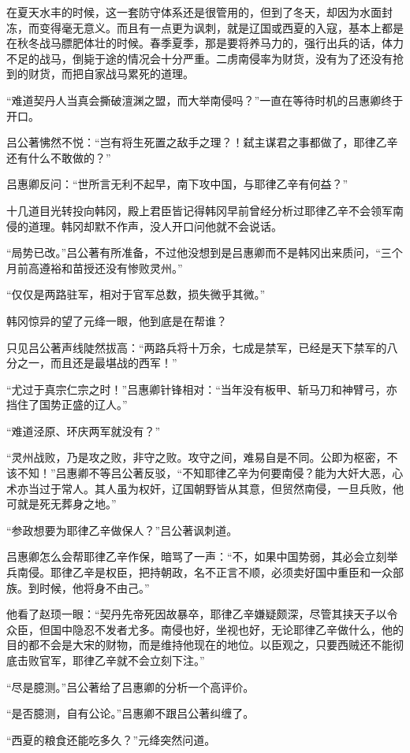 在夏天水丰的时候，这一套防守体系还是很管用的，但到了冬天，却因为水面封冻，而变得毫无意义。而且有一点更为讽刺，就是辽国或西夏的入寇，基本上都是在秋冬战马膘肥体壮的时候。春季夏季，那是要将养马力的，强行出兵的话，体力不足的战马，倒毙于途的情况会十分严重。二虏南侵率为财货，没有为了还没有抢到的财货，而把自家战马累死的道理。

“难道契丹人当真会撕破澶渊之盟，而大举南侵吗？”一直在等待时机的吕惠卿终于开口。

吕公著怫然不悦：“岂有将生死置之敌手之理？！弑主谋君之事都做了，耶律乙辛还有什么不敢做的？”

吕惠卿反问：“世所言无利不起早，南下攻中国，与耶律乙辛有何益？”

十几道目光转投向韩冈，殿上君臣皆记得韩冈早前曾经分析过耶律乙辛不会领军南侵的道理。韩冈却默不作声，没人开口问他就不会说话。

“局势已改。”吕公著有所准备，不过他没想到是吕惠卿而不是韩冈出来质问，“三个月前高遵裕和苗授还没有惨败灵州。”

“仅仅是两路驻军，相对于官军总数，损失微乎其微。”

韩冈惊异的望了元绛一眼，他到底是在帮谁？

只见吕公著声线陡然拔高：“两路兵将十万余，七成是禁军，已经是天下禁军的八分之一，而且还是最堪战的西军！”

“尤过于真宗仁宗之时！”吕惠卿针锋相对：“当年没有板甲、斩马刀和神臂弓，亦挡住了国势正盛的辽人。”

“难道泾原、环庆两军就没有？”

“灵州战败，乃是攻之败，非守之败。攻守之间，难易自是不同。公即为枢密，不该不知！”吕惠卿不等吕公著反驳，“不知耶律乙辛为何要南侵？能为大奸大恶，心术亦当过于常人。其人虽为权奸，辽国朝野皆从其意，但贸然南侵，一旦兵败，他可就是死无葬身之地。”

“参政想要为耶律乙辛做保人？”吕公著讽刺道。

吕惠卿怎么会帮耶律乙辛作保，暗骂了一声：“不，如果中国势弱，其必会立刻举兵南侵。耶律乙辛是权臣，把持朝政，名不正言不顺，必须卖好国中重臣和一众部族。到时候，他将身不由己。”

他看了赵顼一眼：“契丹先帝死因故暴卒，耶律乙辛嫌疑颇深，尽管其挟天子以令众臣，但国中隐忍不发者尤多。南侵也好，坐视也好，无论耶律乙辛做什么，他的目的都不会是大宋的财物，而是维持他现在的地位。以臣观之，只要西贼还不能彻底击败官军，耶律乙辛就不会立刻下注。”

“尽是臆测。”吕公著给了吕惠卿的分析一个高评价。

“是否臆测，自有公论。”吕惠卿不跟吕公著纠缠了。

“西夏的粮食还能吃多久？”元绛突然问道。

